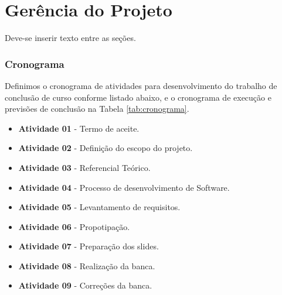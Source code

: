 \chapter{Gerência do Projeto}\label{cap:desenvolvimento}
Deve-se inserir texto entre as seções.
\subsection{Cronograma}

Definimos o cronograma de atividades para desenvolvimento do trabalho de conclusão de curso conforme listado abaixo, e o cronograma de execução e previsões de conclusão na Tabela \ref{tab:cronograma}.

\begin{itemize}
    \item \textbf{Atividade 01} - Termo de aceite.
    \item \textbf{Atividade 02} - Definição do escopo do projeto.
    \item \textbf{Atividade 03} - Referencial Teórico.
    \item \textbf{Atividade 04} - Processo de desenvolvimento de Software.
    \item \textbf{Atividade 05} - Levantamento de requisitos.
    \item \textbf{Atividade 06} - Propotipação.
    \item \textbf{Atividade 07} - Preparação dos slides.
    \item \textbf{Atividade 08} - Realização da banca.
    \item \textbf{Atividade 09} - Correções da banca.
\end{itemize}

